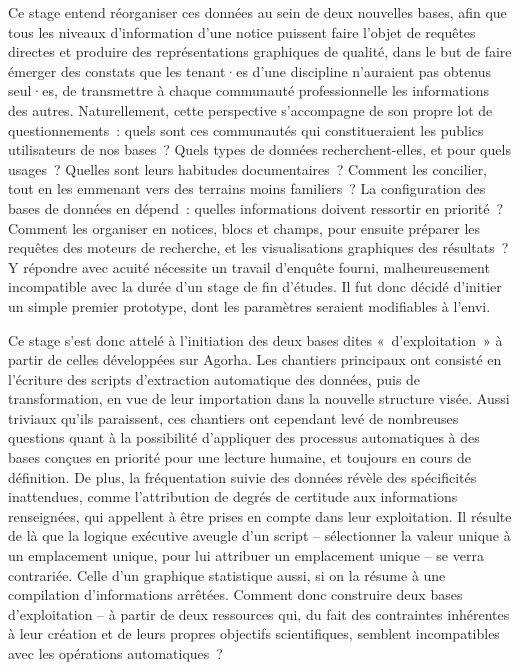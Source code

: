 \documentclass[a4paper,12pt, twoside]{book}
\begin{document}
Ce stage entend réorganiser ces données au sein de deux nouvelles bases, afin que tous les niveaux d’information d’une notice puissent faire l’objet de requêtes directes et produire des représentations graphiques de qualité, dans le but de faire émerger des constats que les tenant·es d’une discipline n’auraient pas obtenus seul·es, de transmettre à chaque communauté professionnelle les informations des autres. Naturellement, cette perspective s’accompagne de son propre lot de questionnements~: quels sont ces communautés qui constitueraient les publics utilisateurs de nos bases~? Quels types de données recherchent-elles, et pour quels usages~? Quelles sont leurs habitudes documentaires~? Comment les concilier, tout en les emmenant vers des terrains moins familiers~? La configuration des bases de données en dépend~: quelles informations doivent ressortir en priorité~? Comment les organiser en notices, blocs et champs, pour ensuite préparer les requêtes des moteurs de recherche, et les visualisations graphiques des résultats~? Y répondre avec acuité nécessite un travail d’enquête fourni, malheureusement incompatible avec la durée d’un stage de fin d’études. Il fut donc décidé d’initier un simple premier prototype, dont les paramètres seraient modifiables à l’envi.

Ce stage s’est donc attelé à l’initiation des deux bases dites «~d’exploitation~» à partir de celles développées sur Agorha. Les chantiers principaux ont consisté en l’écriture des scripts d’extraction automatique des données, puis de transformation, en vue de leur importation dans la nouvelle structure visée. Aussi triviaux qu’ils paraissent, ces chantiers ont cependant levé de nombreuses questions quant à la possibilité d’appliquer des processus automatiques à des bases conçues en priorité pour une lecture humaine, et toujours en cours de définition. De plus, la fréquentation suivie des données révèle des spécificités inattendues, comme l’attribution de degrés de certitude aux informations renseignées, qui appellent à être prises en compte dans leur exploitation. Il résulte de là que la logique exécutive aveugle d’un script – sélectionner la valeur unique à un emplacement unique, pour lui attribuer un emplacement unique – se verra contrariée. Celle d’un graphique statistique aussi, si on la résume à une compilation d’informations arrêtées. Comment donc construire deux bases d’exploitation – à partir de deux ressources qui, du fait des contraintes inhérentes à leur création et de leurs propres objectifs scientifiques, semblent incompatibles avec les opérations automatiques~?
\end{document}
